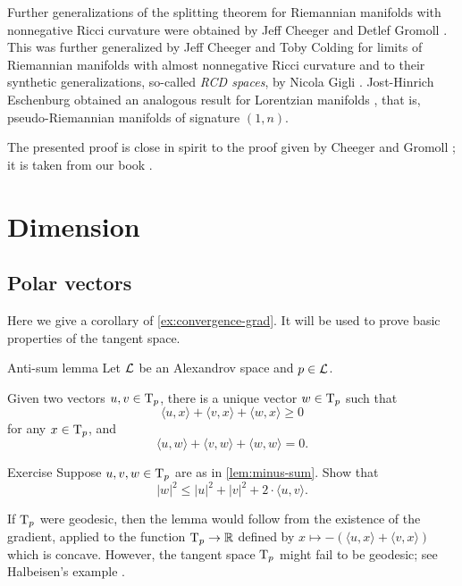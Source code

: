 Further generalizations of the splitting theorem for Riemannian manifolds with nonnegative Ricci curvature were obtained by Jeff Cheeger and Detlef Gromoll \cite{cheeger-gromoll-split}.
This was further generalized by Jeff Cheeger and Toby Colding for limits of Riemannian manifolds with almost nonnegative Ricci curvature \cite{cheeger-colding-alm-rigidity} and to their synthetic generalizations, so-called {}\emph{RCD spaces}, by Nicola Gigli \cite{gigli2013splitting, gigli-splitting-overview}.
Jost-Hinrich Eschenburg obtained an analogous result for  Lorentzian manifolds \cite{eshenburg-split}, that is, pseudo-Riemannian manifolds of signature $(1,n)$.

The presented proof is close in spirit to the proof given by Cheeger and Gromoll \cite{cheeger-gromoll-split};
it is taken from our book \cite{alexander-kapovitch-petrunin2024}.

\chapter{Dimension}\label{chap:dim}

\section{Polar vectors}

Here we give a corollary of \ref{ex:convergence-grad}.
It will be used to prove basic properties of the tangent space.


\begin{thm}{Anti-sum lemma}\label{lem:minus-sum} 
Let $\mathcal{L}$ be an Alexandrov space and $p\in \mathcal{L}$.

Given two vectors $u,v\in \mathrm{T}_p$, there is a unique vector $w\in \mathrm{T}_p$ such that
\[\langle u,x\rangle +\langle v,x\rangle +\langle w,x\rangle \ge 0\]
for any $x\in \mathrm{T}_p$, and
\[\langle u,w\rangle +\langle v,w\rangle +\langle w,w\rangle =0.\]

\end{thm}

\begin{thm}{Exercise}\label{ex:|antisum|}
Suppose $u,v, w\in \mathrm{T}_p$ are as in \ref{lem:minus-sum}.
Show that 
\[|w|^2\le |u|^2+|v|^2+2\cdot\langle u,v\rangle.\]

\end{thm}


If $\mathrm{T}_p$ were geodesic, then the lemma would follow from the existence  of the gradient, applied to the function $\mathrm{T}_p\to \mathbb{R}$ defined by $x\mapsto -(\langle u,x\rangle +\langle v,x\rangle )$ which is concave.
However, the tangent space $\mathrm{T}_p$ might fail to be geodesic; see  Halbeisen's example \cite{alexander-kapovitch-petrunin2024}.


